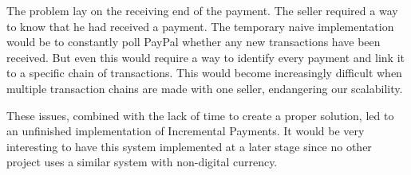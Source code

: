 The problem lay on the receiving end of the payment.
The seller required a way to know that he had received a payment.
The temporary naive implementation would be to constantly poll PayPal whether any new transactions have been received.
But even this would require a way to identify every payment and link it to a specific chain of transactions.
This would become increasingly difficult when multiple transaction chains are made with one seller, endangering our scalability.

These issues, combined with the lack of time to create a proper solution, led to an unfinished implementation of Incremental Payments.
It would be very interesting to have this system implemented at a later stage since no other project uses a similar system with non-digital currency.
